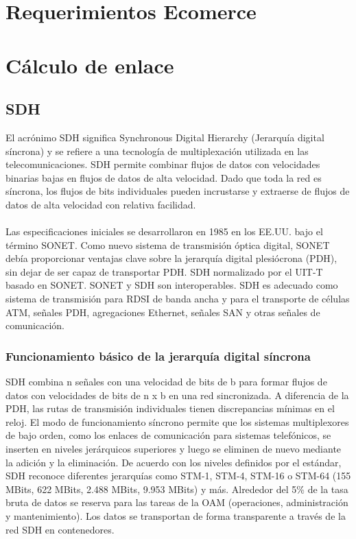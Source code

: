\documentclass[12pt,letterpaper]{article}
\begin{document}
\newpage
\section{Requerimientos Ecomerce}

\newpage
\section{Cálculo de enlace}
\subsection{SDH}
El acrónimo SDH significa Synchronous Digital Hierarchy (Jerarquía digital síncrona) y se 
refiere a una tecnología de multiplexación utilizada en las telecomunicaciones. SDH permite 
combinar flujos de datos con velocidades binarias bajas en flujos de datos de alta velocidad. 
Dado que toda la red es síncrona, los flujos de bits individuales pueden incrustarse y 
extraerse de flujos de datos de alta velocidad con relativa facilidad.
\\ \\
Las especificaciones iniciales se desarrollaron en 1985 en los EE.UU. bajo el término SONET. 
Como nuevo sistema de transmisión óptica digital, SONET debía proporcionar ventajas clave 
sobre la jerarquía digital plesiócrona (PDH), sin dejar de ser capaz de transportar PDH. 
SDH normalizado por el UIT-T basado en SONET. SONET y SDH son interoperables. SDH es 
adecuado como sistema de transmisión para RDSI de banda ancha y para el transporte de 
células ATM, señales PDH, agregaciones Ethernet, señales SAN y otras señales de comunicación.

\subsubsection{Funcionamiento básico de la jerarquía digital síncrona}
SDH combina n señales con una velocidad de bits de b para formar flujos de datos con 
velocidades de bits de n x b en una red sincronizada. A diferencia de la PDH, las rutas de 
transmisión individuales tienen discrepancias mínimas en el reloj. El modo de 
funcionamiento síncrono permite que los sistemas multiplexores de bajo orden, como los 
enlaces de comunicación para sistemas telefónicos, se inserten en niveles jerárquicos 
superiores y luego se eliminen de nuevo mediante la adición y la eliminación. De acuerdo 
con los niveles definidos por el estándar, SDH reconoce diferentes jerarquías como STM-1, 
STM-4, STM-16 o STM-64 (155 MBits, 622 MBits, 2.488 MBits, 9.953 MBits) y más. Alrededor 
del 5\% de la tasa bruta de datos se reserva para las tareas de la OAM (operaciones, 
administración y mantenimiento). Los datos se transportan de forma transparente a través 
de la red SDH en contenedores.
\end{document}
